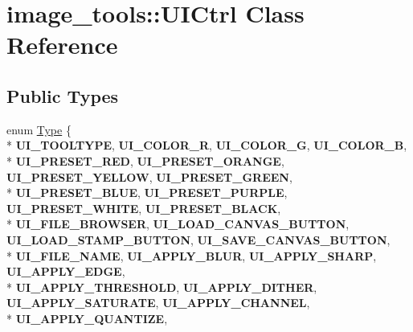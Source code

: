 \hypertarget{classimage__tools_1_1UICtrl}{}\section{image\+\_\+tools\+:\+:U\+I\+Ctrl Class Reference}
\label{classimage__tools_1_1UICtrl}
\subsection*{Public Types}
\begin{DoxyCompactItemize}
\item 
enum \hyperlink{classimage__tools_1_1UICtrl_a94c1180d7f5541b2d52d0f56ff6dfbd6}{Type} \{ \\*
{\bfseries U\+I\+\_\+\+T\+O\+O\+L\+T\+Y\+PE}, 
{\bfseries U\+I\+\_\+\+C\+O\+L\+O\+R\+\_\+R}, 
{\bfseries U\+I\+\_\+\+C\+O\+L\+O\+R\+\_\+G}, 
{\bfseries U\+I\+\_\+\+C\+O\+L\+O\+R\+\_\+B}, 
\\*
{\bfseries U\+I\+\_\+\+P\+R\+E\+S\+E\+T\+\_\+\+R\+ED}, 
{\bfseries U\+I\+\_\+\+P\+R\+E\+S\+E\+T\+\_\+\+O\+R\+A\+N\+GE}, 
{\bfseries U\+I\+\_\+\+P\+R\+E\+S\+E\+T\+\_\+\+Y\+E\+L\+L\+OW}, 
{\bfseries U\+I\+\_\+\+P\+R\+E\+S\+E\+T\+\_\+\+G\+R\+E\+EN}, 
\\*
{\bfseries U\+I\+\_\+\+P\+R\+E\+S\+E\+T\+\_\+\+B\+L\+UE}, 
{\bfseries U\+I\+\_\+\+P\+R\+E\+S\+E\+T\+\_\+\+P\+U\+R\+P\+LE}, 
{\bfseries U\+I\+\_\+\+P\+R\+E\+S\+E\+T\+\_\+\+W\+H\+I\+TE}, 
{\bfseries U\+I\+\_\+\+P\+R\+E\+S\+E\+T\+\_\+\+B\+L\+A\+CK}, 
\\*
{\bfseries U\+I\+\_\+\+F\+I\+L\+E\+\_\+\+B\+R\+O\+W\+S\+ER}, 
{\bfseries U\+I\+\_\+\+L\+O\+A\+D\+\_\+\+C\+A\+N\+V\+A\+S\+\_\+\+B\+U\+T\+T\+ON}, 
{\bfseries U\+I\+\_\+\+L\+O\+A\+D\+\_\+\+S\+T\+A\+M\+P\+\_\+\+B\+U\+T\+T\+ON}, 
{\bfseries U\+I\+\_\+\+S\+A\+V\+E\+\_\+\+C\+A\+N\+V\+A\+S\+\_\+\+B\+U\+T\+T\+ON}, 
\\*
{\bfseries U\+I\+\_\+\+F\+I\+L\+E\+\_\+\+N\+A\+ME}, 
{\bfseries U\+I\+\_\+\+A\+P\+P\+L\+Y\+\_\+\+B\+L\+UR}, 
{\bfseries U\+I\+\_\+\+A\+P\+P\+L\+Y\+\_\+\+S\+H\+A\+RP}, 
{\bfseries U\+I\+\_\+\+A\+P\+P\+L\+Y\+\_\+\+E\+D\+GE}, 
\\*
{\bfseries U\+I\+\_\+\+A\+P\+P\+L\+Y\+\_\+\+T\+H\+R\+E\+S\+H\+O\+LD}, 
{\bfseries U\+I\+\_\+\+A\+P\+P\+L\+Y\+\_\+\+D\+I\+T\+H\+ER}, 
{\bfseries U\+I\+\_\+\+A\+P\+P\+L\+Y\+\_\+\+S\+A\+T\+U\+R\+A\+TE}, 
{\bfseries U\+I\+\_\+\+A\+P\+P\+L\+Y\+\_\+\+C\+H\+A\+N\+N\+EL}, 
\\*
{\bfseries U\+I\+\_\+\+A\+P\+P\+L\+Y\+\_\+\+Q\+U\+A\+N\+T\+I\+ZE}, 

\end{DoxyCompactItemize}
